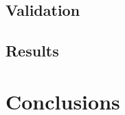 \documentclass{ article}
\begin{document}
	\subsection{Validation}
	\label{section:validation}
	
	\subsection{Results}
	\label{section:results}

\section{Conclusions}
\label{section:conclusions}



\end{document}
